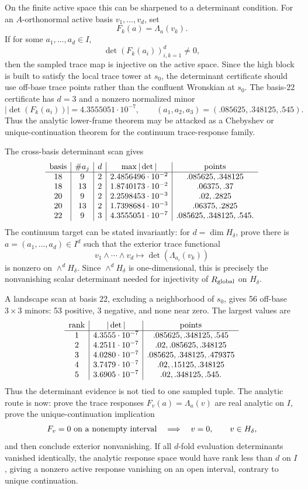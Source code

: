 \documentclass[11pt]{article}
\begin{document}
On the finite active space this can be sharpened to a determinant condition.
For an \(A\)-orthonormal active basis \(v_1,\ldots,v_d\), set
\[
  F_k(a)=\Lambda_a(v_k).
\]
If for some \(a_1,\ldots,a_d\in I\),
\[
  \det(F_k(a_i))_{i,k=1}^d\ne0,
\]
then the sampled trace map is injective on the active space.  Since the high
block is built to satisfy the local trace tower at \(s_0\), the determinant
certificate should use off-base trace points rather than the confluent
Wronskian at \(s_0\).  The basis-22 certificate has \(d=3\) and a nonzero
normalized minor
\[
  |\det(F_k(a_i))|=4.3555051\cdot10^{-7},
  \qquad
  (a_1,a_2,a_3)=(.085625,.348125,.545).
\]
Thus the analytic lower-frame theorem may be attacked as a Chebyshev or
unique-continuation theorem for the continuum trace-response family.

The cross-basis determinant scan gives
\[
\begin{array}{c|c|c|c|c}
{\rm basis}&\#a_j&d&\max|\det|&{\rm points}\\\hline
18&9&2&2.4856496\cdot10^{-2}&.085625,.348125\\
18&13&2&1.8740173\cdot10^{-2}&.06375,.37\\
20&9&2&2.2598453\cdot10^{-3}&.02,.2825\\
20&13&2&1.7398684\cdot10^{-3}&.06375,.2825\\
22&9&3&4.3555051\cdot10^{-7}&.085625,.348125,.545.
\end{array}
\]
The continuum target can be stated invariantly: for \(d=\dim H_\delta\), prove
there is \(a=(a_1,\ldots,a_d)\in I^d\) such that the exterior trace functional
\[
  v_1\wedge\cdots\wedge v_d
  \mapsto \det(\Lambda_{a_i}(v_k))
\]
is nonzero on \(\wedge^dH_\delta\).  Since \(\wedge^dH_\delta\) is
one-dimensional, this is precisely the nonvanishing scalar determinant needed
for injectivity of \(R_{\rm global}\) on \(H_\delta\).

A landscape scan at basis \(22\), excluding a neighborhood of \(s_0\), gives
56 off-base \(3\times3\) minors: 53 positive, 3 negative, and none near zero.
The largest values are
\[
\begin{array}{c|c|c}
{\rm rank}&|\det|&{\rm points}\\\hline
1&4.3555\cdot10^{-7}&.085625,.348125,.545\\
2&4.2511\cdot10^{-7}&.02,.085625,.348125\\
3&4.0280\cdot10^{-7}&.085625,.348125,.479375\\
4&3.7479\cdot10^{-7}&.02,.15125,.348125\\
5&3.6905\cdot10^{-7}&.02,.348125,.545.
\end{array}
\]
Thus the determinant evidence is not tied to one sampled tuple.  The analytic
route is now: prove the trace responses \(F_v(a)=\Lambda_a(v)\) are real
analytic on \(I\), prove the unique-continuation implication
\[
  F_v=0\ {\rm on\ a\ nonempty\ interval}\quad\Longrightarrow\quad v=0,
  \qquad v\in H_\delta,
\]
and then conclude exterior nonvanishing.  If all \(d\)-fold evaluation
determinants vanished identically, the analytic response space would have rank
less than \(d\) on \(I\), giving a nonzero active response vanishing on an open
interval, contrary to unique continuation.
\end{document}
